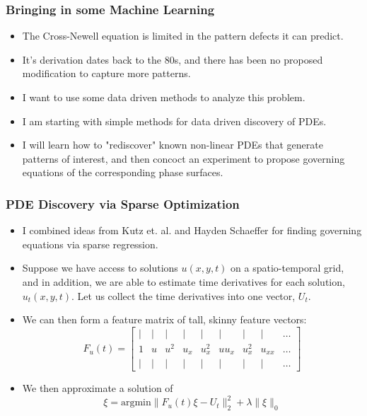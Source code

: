 \documentclass[]{beamer}
\begin{document}
\begin{frame}
     \frametitle{Bringing in some Machine Learning}
     \begin{itemize}
         \item The Cross-Newell equation is limited in the pattern defects it can predict.
        \item It's derivation dates back to the 80s, and there has been no proposed modification to capture more patterns.
        \item I want to use some data driven methods to analyze this problem.
        \item I am starting with simple methods for data driven discovery of PDEs.
        \item I will learn how to "rediscover" known non-linear PDEs that generate patterns of interest, and then concoct an experiment to propose governing equations of the corresponding phase surfaces.
     \end{itemize}
\end{frame}

\begin{frame}
    \frametitle{PDE Discovery via Sparse Optimization}
\begin{itemize}
  \item I combined ideas from Kutz et. al. and Hayden Schaeffer for finding governing equations via sparse regression.
  \item Suppose we have access to solutions $u(x,y,t)$ on a spatio-temporal grid, and in addition, we are able to estimate time derivatives for each solution, $u_t(x,y,t)$. Let us collect the time derivatives into one vector, $U_t$.
\item 
    We can then form a feature matrix of tall, skinny feature vectors:
    \[
        F_u(t) = \begin{bmatrix}| & | & | & | & | & | & | & | & \dots\\
            1 & u & u^2 & u_x & u_x^2 & uu_x & u_x^2 & u_{xx} & \dots\\
                                | & | & | & | & | & | & | & | & \dots
                 \end{bmatrix}
    \] 
\item 
    We then approximate a solution of
    \[
        \xi = \text{argmin}\|F_u(t)\xi - U_t\|_2^2 + \lambda \|\xi\|_0
    \] 
\end{itemize}
\end{frame}
\end{document}
